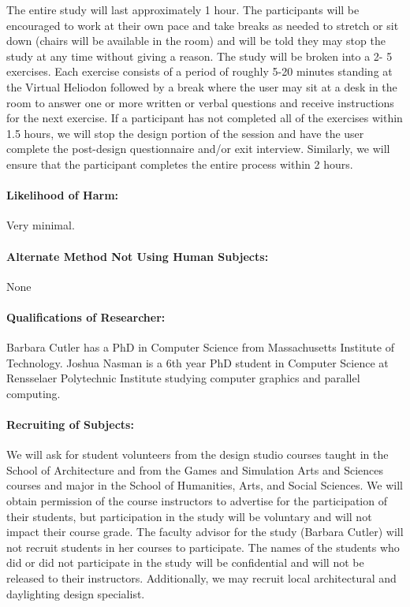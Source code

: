 \documentclass[10pt]{article}
\begin{document}
\noindent 
The entire study will last approximately 1 hour. The participants will be encouraged to work at their own
pace and take breaks as needed to stretch or sit down (chairs will be available in the room) and will be
told they may stop the study at any time without giving a reason. The study will be broken into a 2-
5 exercises. Each exercise consists of a period of roughly 5-20 minutes standing at the Virtual Heliodon
followed by a break where the user may sit at a desk in the room to answer one or more written or verbal
questions and receive instructions for the next exercise. If a participant has not completed all of the exercises
within 1.5 hours, we will stop the design portion of the session and have the user complete the post-design
questionnaire and/or exit interview. Similarly, we will ensure that the participant completes the entire
process within 2 hours.


\paragraph{Likelihood of Harm:}   Very minimal.

\paragraph{Alternate Method Not Using Human Subjects:}
None

\paragraph{Qualifications of Researcher:}
Barbara Cutler has a PhD in Computer Science from Massachusetts
Institute of Technology.  Joshua Nasman is a 6th year PhD student in
Computer Science at Rensselaer Polytechnic Institute studying computer
graphics and parallel computing.

\paragraph{Recruiting of Subjects:}
We will ask for student volunteers from the design studio courses taught in the
School of Architecture
and from the Games and Simulation Arts
and Sciences courses and major in the School of Humanities, Arts, and
Social Sciences.  We will obtain permission of the course instructors
to advertise for the participation of their students, but
participation in the study will be voluntary and will not impact their
course grade.  The faculty advisor for the study (Barbara Cutler) will
not recruit students in her courses to participate.  The names of the
students who did or did not participate in the study will be
confidential and will not be released to their instructors.  Additionally, we may recruit local architectural and daylighting design specialist.
\end{document}
